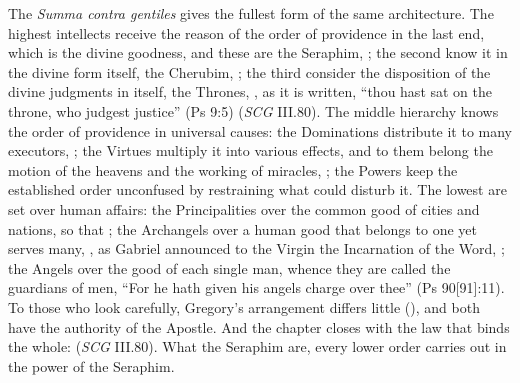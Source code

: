 The \emph{Summa contra gentiles} gives the fullest form of the same
architecture. The highest intellects receive the reason of the order of
providence in the last end, which is the divine goodness, and these are the
Seraphim, ; the second know it
in the divine form itself, the Cherubim, ; the third consider
the disposition of the divine judgments in itself, the Thrones, , as it is written, ``thou hast
sat on the throne, who judgest justice'' (Ps 9:5) (\emph{SCG} III.80). The
middle hierarchy knows the order of providence in universal causes: the
Dominations distribute it to many executors, ; the Virtues multiply it into various
effects, and to them belong the motion of the heavens and the working of
miracles, ; the
Powers keep the established order unconfused by restraining what could
disturb it. The lowest are set over human affairs: the Principalities over
the common good of cities and nations, so that ; the Archangels over a human good that belongs to one yet
serves many, , as Gabriel
announced to the Virgin the Incarnation of the Word, ; the Angels over the good of each single man, whence they are called
the guardians of men, ``For he hath given his angels charge over thee''
(Ps 90[91]:11). To those who look carefully, Gregory's arrangement differs
little (), and both have the
authority of the Apostle. And the chapter closes with the law that binds the
whole: 
(\emph{SCG} III.80). What the Seraphim are, every lower order carries out in
the power of the Seraphim.


